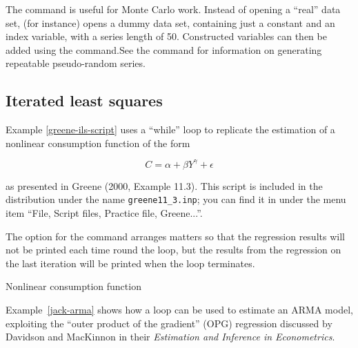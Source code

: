 The command  is useful for Monte Carlo work.  Instead of
opening a ``real'' data set,  (for instance) opens a
dummy data set, containing just a constant and an index variable, with
a series length of 50. Constructed variables can then be added using
the  command.See the  command for information on
generating repeatable pseudo-random series.

\subsection{Iterated least squares}
\label{loop-ils-examples}

Example \ref{greene-ils-script} uses a ``while'' loop to replicate the
estimation of a nonlinear consumption function of the form
	
\[ C = \alpha + \beta Y^{\gamma} + \epsilon \]

as presented in Greene (2000, Example 11.3).  This script is included
in the  distribution under the name \verb+greene11_3.inp+;
you can find it in  under the menu item ``File, Script files,
Practice file, Greene...''.

The option  for the  command arranges
matters so that the regression results will not be printed each time
round the loop, but the results from the regression on the last
iteration will be printed when the loop terminates.

\begin{script}[htbp]
  \caption{Nonlinear consumption function}
  \label{greene-ils-script}
\end{script}

Example~\ref{jack-arma} shows how a loop can be used to
estimate an ARMA model, exploiting the ``outer product of the
gradient'' (OPG) regression discussed by Davidson and MacKinnon in
their \emph{Estimation and Inference in Econometrics}.

